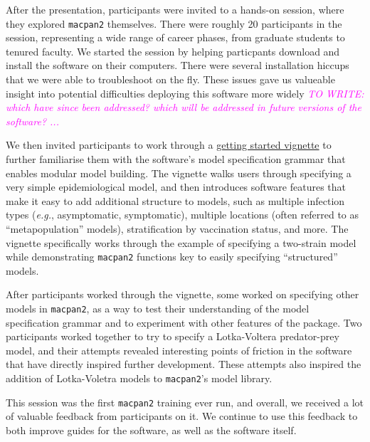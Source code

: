 \documentclass{article}
\newcommand{\towrite}[1]{\textcolor{magenta}{\textsl{TO WRITE: #1}}}
\newcommand{\macpan}{\texttt{macpan2}\xspace}
\newcommand{\eg}{\textit{e.g.},\xspace}
\begin{document}
  After the presentation, participants were invited to a hands-on session, where they explored \macpan themselves. There were roughly 20 participants in the session, representing a wide range of career phases, from graduate students to tenured faculty. We started the session by helping particpants download and install the software on their computers. There were several installation hiccups that we were able to troubleshoot on the fly. These issues gave us valueable insight into potential difficulties deploying this software more widely \towrite{which have since been addressed? which will be addressed in future versions of the software? ...}

  We then invited participants to work through a \href{https://github.com/canmod/macpan2/blob/refactorcpp/vignettes/quickstart.Rmd}{getting started vignette} to further familiarise them with the software's model specification grammar that enables modular model building. The vignette walks users through specifying a very simple epidemiological model, and then introduces software features that make it easy to add additional structure to models, such as multiple infection types (\eg asymptomatic, symptomatic), multiple locations (often referred to as ``metapopulation'' models), stratification by vaccination status, and more. The vignette specifically works through the example of specifying a two-strain model while demonstrating \macpan functions key to easily specifying ``structured'' models.

  After participants worked through the vignette, some worked on specifying other models in \macpan, as a way to test their understanding of the model specification grammar and to experiment with other features of the package. Two participants worked together to try to specify a Lotka-Voltera predator-prey model, and their attempts revealed interesting points of friction in the software that have directly inspired further development. These attempts also inspired the addition of Lotka-Voletra models to \macpan's model library.

  This session was the first \macpan training ever run, and overall, we received a lot of valuable feedback from participants on it. We continue to use this feedback to both improve guides for the software, as well as the software itself.
\end{document}
